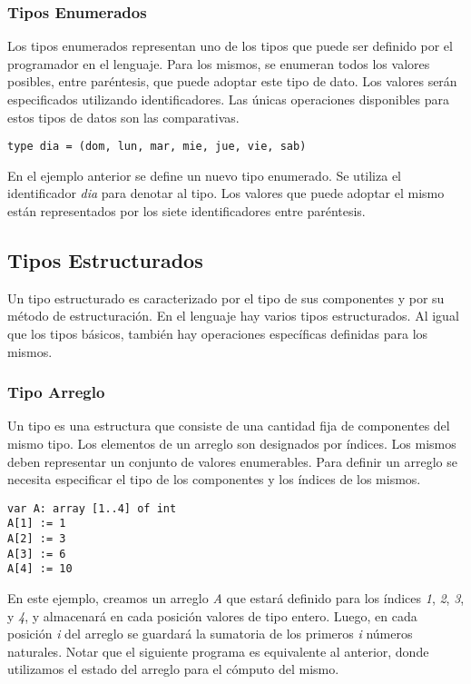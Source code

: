 \documentclass{article}
\begin{document}
\subsubsection{Tipos Enumerados}

Los tipos enumerados representan uno de los tipos que puede ser definido por el programador en el lenguaje.
Para los mismos, se enumeran todos los valores posibles, entre paréntesis, que puede adoptar este tipo de dato.
Los valores serán especificados utilizando identificadores.
Las únicas operaciones disponibles para estos tipos de datos son las comparativas.

\begin{lstlisting}
type dia = (dom, lun, mar, mie, jue, vie, sab)
\end{lstlisting}

En el ejemplo anterior se define un nuevo tipo enumerado.
Se utiliza el identificador \textit{dia} para denotar al tipo.
Los valores que puede adoptar el mismo están representados por los siete identificadores entre paréntesis.

\subsection{Tipos Estructurados}

Un tipo estructurado es caracterizado por el tipo de sus componentes y por su método de estructuración.
En el lenguaje hay varios tipos estructurados.
Al igual que los tipos básicos, también hay operaciones específicas definidas para los mismos.

\subsubsection{Tipo Arreglo}

Un tipo  es una estructura que consiste de una cantidad fija de componentes del mismo tipo.
Los elementos de un arreglo son designados por índices.
Los mismos deben representar un conjunto de valores enumerables.
Para definir un arreglo se necesita especificar el tipo de los componentes y los índices de los mismos.

\begin{lstlisting}
var A: array [1..4] of int
A[1] := 1 
A[2] := 3
A[3] := 6
A[4] := 10
\end{lstlisting}

En este ejemplo, creamos un arreglo \textit{A} que estará definido para los índices \textit{1}, \textit{2}, \textit{3}, y \textit{4}, y almacenará en cada posición valores de tipo entero.
Luego, en cada posición \textit{i} del arreglo se guardará la sumatoria de los primeros \textit{i} números naturales.
Notar que el siguiente programa es equivalente al anterior, donde utilizamos el estado del arreglo para el cómputo del mismo.
\end{document}
